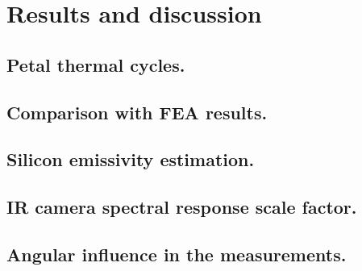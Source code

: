 \pagestyle{standard}

\chapter{Results and discussion}\label{chapter4}

	\thispagestyle{chapter-first-page}

	\section{Petal thermal cycles.}\label{section4.1}
	
	\section{Comparison with FEA results.}\label{section4.2}
	
	\section{Silicon emissivity estimation.}\label{section4.3}
	
	\section{IR camera spectral response scale factor.}\label{section4.4}
	
	\section{Angular influence in the measurements.}\label{section4.5}
	
	